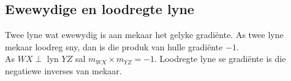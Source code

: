 \subsection*{Ewewydige en loodregte lyne}    
% 
Twee lyne wat ewewydig is aan mekaar het gelyke gradi\"ente. As twee lyne mekaar loodreg sny, dan is die produk van hulle gradi\"ente $-1$. \\

As $WX \perp $ lyn $ YZ$ sal $m_{WX} \times m_{YZ} = -1$. Loodregte lyne se gradi\"ente is die negatiewe inverses van mekaar.

\par
{}

